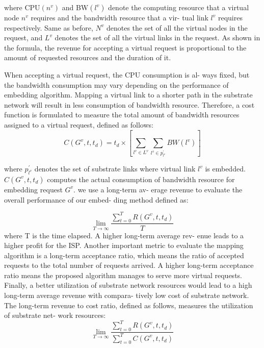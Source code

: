 \documentclass[12pt]{article}
\begin{document}
where CPU$(n^v)$ and BW$(l^v)$ denote the computing resource that
a virtual node $n^v$ requires and the bandwidth resource that a vir-
tual link $l^v$ requires respectively. Same as before, $N^v$ denotes the
set of all the virtual nodes in the request, and $L^v$ denotes the set
of all the virtual links in the request. As shown in the formula,
the revenue for accepting a virtual request is proportional to the
amount of requested resources and the duration of it.

When accepting a virtual request, the CPU consumption is al-
ways fixed, but the bandwidth consumption may vary depending
on the performance of embedding algorithm. Mapping a virtual
link to a shorter path in the substrate network will result in less
consumption of bandwidth resource. Therefore, a cost function is
formulated to measure the total amount of bandwidth resources
assigned to a virtual request, defined as follows:
\begin{equation}
C(G^v, t, t_d) = t_d \times [\sum_{l^v \in L^v} \sum_{l^s \in p^\prime_{l^v}} BW(l^v)]
\end{equation}

where $ p^\prime_{l^v}$ denotes the set of substrate links where virtual link $l^v$
is embedded. $C(G^v, t, t_d)$ computes the actual consumption of
bandwidth resource for embedding request $G^v$.
we use a long-term av-
erage revenue to evaluate the overall performance of our embed-
ding method defined as:

\begin{equation}
\lim\limits_{T \to \infty } \frac{\sum_{t= 0}^{T} R(G^v, t, t_d)}{T}
\end{equation}
where T is the time elapsed. A higher long-term average rev-
enue leads to a higher profit for the ISP. Another important metric
to evaluate the mapping algorithm is a long-term acceptance ratio,
which means the ratio of accepted requests to the total number
of requests arrived. A higher long-term acceptance ratio means the
proposed algorithm manages to serve more virtual requests.
Finally, a better utilization of substrate network resources
would lead to a high long-term average revenue with compara-
tively low cost of substrate network. The long-term revenue to cost
ratio, defined as follows, measures the utilization of substrate net-
work resources:
\begin{equation}
\lim\limits_{T \to \infty } \frac{\sum_{t= 0}^{T} R(G^v, t, t_d)}{\sum_{t= 0}^{T} C(G^v, t, t_d)}
\end{equation}
\end{document}
